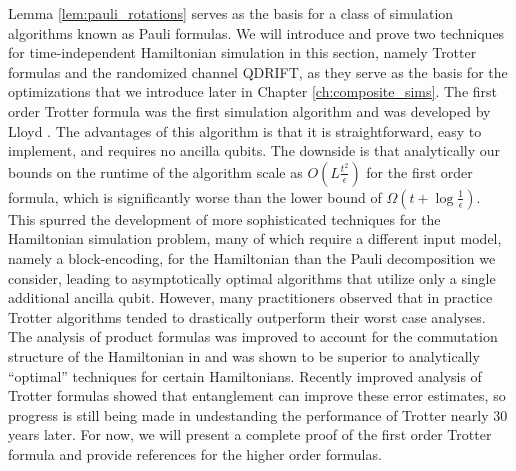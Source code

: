 Lemma \ref{lem:pauli_rotations} serves as the basis for a class of simulation algorithms known as Pauli formulas.
We will introduce and prove two techniques for time-independent Hamiltonian simulation in this section, namely Trotter formulas and the randomized channel QDRIFT, as they serve as the basis for the optimizations that we introduce later in Chapter \ref{ch:composite_sims}.
The first order Trotter formula was the first simulation algorithm and was developed by Lloyd \cite{lloyd1996universal}. 
The advantages of this algorithm is that it is straightforward, easy to implement, and requires no ancilla qubits. 
The downside is that analytically our bounds on the runtime of the algorithm scale as $O\left( L \frac{t^2}{\epsilon}\right)$ for the first order formula, which is significantly worse than the lower bound of $\Omega\left(t + \log \frac{1}{\epsilon} \right)$. 
This spurred the development of more sophisticated techniques for the Hamiltonian simulation problem, many of which require a different input model, namely a block-encoding, for the Hamiltonian than the Pauli decomposition we consider, leading to asymptotically optimal algorithms \cite{low2019hamiltonian} that utilize only a single additional ancilla qubit. However, many practitioners observed that in practice Trotter algorithms tended to drastically outperform their worst case analyses. The analysis of product formulas was improved to account for the commutation structure of the Hamiltonian in \cite{childs2021theory} and was shown to be superior to analytically ``optimal'' techniques for certain Hamiltonians. Recently improved analysis of Trotter formulas showed that entanglement can improve these error estimates, so progress is still being made in undestanding the performance of Trotter nearly 30 years later. For now, we will present a complete proof of the first order Trotter formula and provide references for the higher order formulas.


